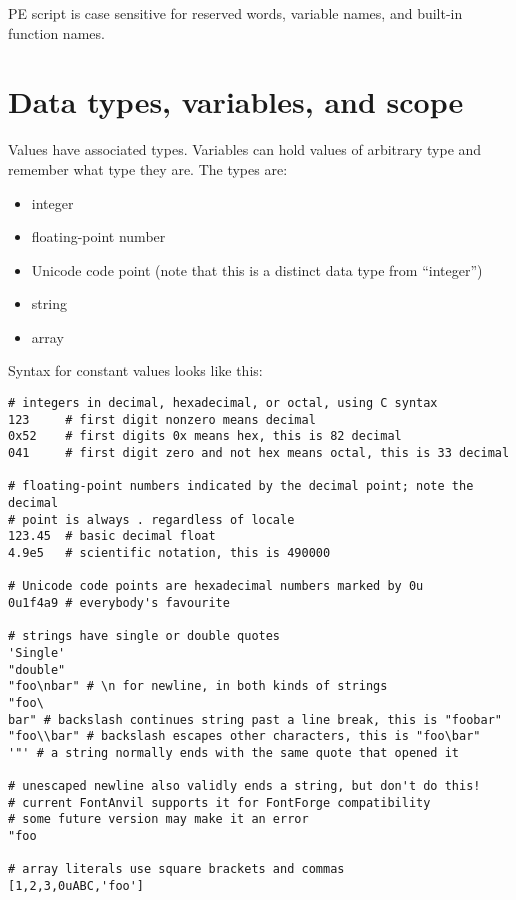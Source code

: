 \begin{framed}
PE script is case sensitive for reserved words, variable names,
and built-in function names.
\end{framed}

\section{Data types, variables, and scope}

Values have associated types.  Variables can hold values of arbitrary type
and remember what type they are.  The types are:
\begin{itemize}
\item integer
\item floating-point number
\item Unicode code point (note that this is a distinct data type from
``integer'')
\item string
\item array
\end{itemize}

Syntax for constant values looks like this:
\begin{verbatim}
# integers in decimal, hexadecimal, or octal, using C syntax
123     # first digit nonzero means decimal
0x52    # first digits 0x means hex, this is 82 decimal
041     # first digit zero and not hex means octal, this is 33 decimal

# floating-point numbers indicated by the decimal point; note the decimal
# point is always . regardless of locale
123.45  # basic decimal float
4.9e5   # scientific notation, this is 490000

# Unicode code points are hexadecimal numbers marked by 0u
0u1f4a9 # everybody's favourite

# strings have single or double quotes
'Single'
"double"
"foo\nbar" # \n for newline, in both kinds of strings
"foo\
bar" # backslash continues string past a line break, this is "foobar"
"foo\\bar" # backslash escapes other characters, this is "foo\bar" 
'"' # a string normally ends with the same quote that opened it

# unescaped newline also validly ends a string, but don't do this!
# current FontAnvil supports it for FontForge compatibility
# some future version may make it an error
"foo

# array literals use square brackets and commas
[1,2,3,0uABC,'foo']
\end{verbatim}

